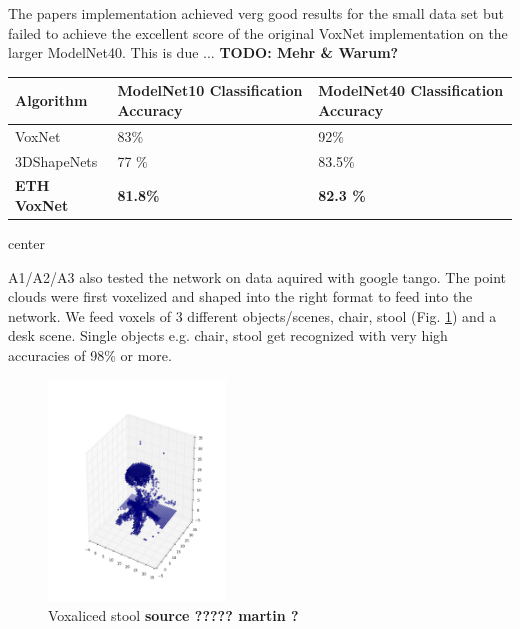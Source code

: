 \documentclass[10pt,twocolumn,letterpaper]{article}
\begin{document}
The papers implementation achieved verg good results for the small data set but failed to achieve the excellent score of the 
original VoxNet implementation on the larger ModelNet40. 
This is due ... \textbf{TODO: Mehr \& Warum?} \\ 
\begin{center}
\begin{tabular}{ |p{2.3cm}||p{2.3cm}|p{2.3cm}|  }
 \hline
 Algorithm & ModelNet10 Classification Accuracy  & ModelNet40 Classification Accuracy \\
 \hline
 VoxNet \cite{voxnet}   & 83\% & 92\% \\
 3DShapeNets  \cite{shape}   & 77 \% & 83.5\% \\
\textbf{ETH VoxNet}    & \textbf{81.8\%}   & \textbf{82.3 \%}  \\
 \hline
\end{tabular}
\end{center}{center}

\vspace{0.3cm}
A1/A2/A3 also tested the network on data aquired with google tango. The point clouds were first voxelized
and shaped into the right format to feed into the network. We feed voxels of 3 different objects/scenes, chair, 
stool (Fig. \ref{fig:voxel_stool}) and a desk scene. Single objects e.g. chair, stool get recognized with very high accuracies of 98\% or more.

\begin{figure}[h]
	\label{fig:voxel_stool}
	\centering
	\includegraphics[width=0.42\textwidth]{figures/tango_voxel_stool}
	\caption{Voxaliced stool \textbf{ source ????? martin ?}}
\end{figure}
\end{document}
